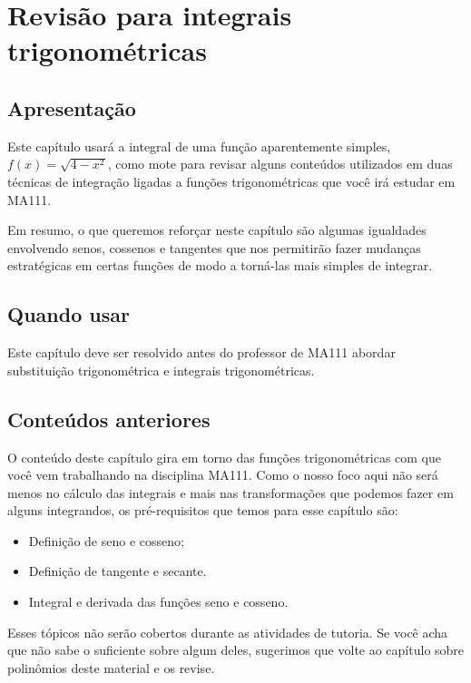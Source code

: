 \documentclass[main_estudante.tex]{subfiles}
\begin{document}
\chapter{Revisão para integrais trigonométricas}

\section{Apresentação}

Este capítulo usará a integral de uma função aparentemente simples, $f(x)=\sqrt{4-x^2}$, como mote para revisar alguns conteúdos utilizados em duas técnicas de integração ligadas a funções trigonométricas que você irá estudar em MA111.

Em resumo, o que queremos reforçar neste capítulo são algumas igualdades envolvendo senos, cossenos e tangentes que nos permitirão fazer mudanças estratégicas em certas funções de modo a torná-las mais simples de integrar.

\section{Quando usar}

Este capítulo deve ser resolvido antes do professor de MA111 abordar substituição trigonométrica e integrais trigonométricas.

\section{Conteúdos anteriores}

O conteúdo deste capítulo gira em torno das funções trigonométricas com que você vem trabalhando na disciplina MA111. Como o nosso foco aqui não será menos no cálculo das integrais e mais nas transformações que podemos fazer em alguns integrandos, os pré-requisitos que temos para esse capítulo são:
\begin{itemize}
 \item Definição de seno e cosseno;
 \item Definição de tangente e secante.
 \item Integral e derivada das funções seno e cosseno.
\end{itemize}

Esses tópicos não serão cobertos durante as atividades de tutoria. Se você acha que não sabe o suficiente sobre algum deles, sugerimos que volte ao capítulo sobre polinômios deste material e os revise.

\newpage
\end{document}
